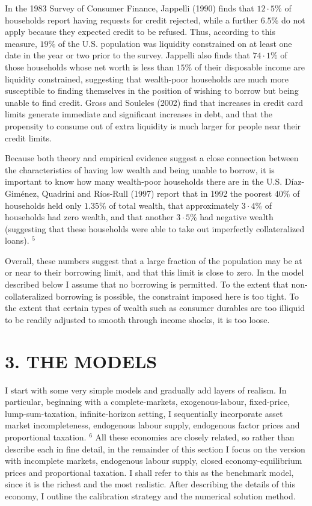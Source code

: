 \documentclass[11pt]{article}
\begin{document}
In the 1983 Survey of Consumer Finance, Jappelli (1990) finds that $12 \cdot 5 \%$ of households report having requests for credit rejected, while a further $6.5 \%$ do not apply because they expected credit to be refused. Thus, according to this measure, $19 \%$ of the U.S. population was liquidity constrained on at least one date in the year or two prior to the survey. Jappelli also finds that $74 \cdot 1 \%$ of those households whose net worth is less than $15 \%$ of their disposable income are liquidity constrained, suggesting that wealth-poor households are much more susceptible to finding themselves in the position of wishing to borrow but being unable to find credit. Gross and Souleles (2002) find that increases in credit card limits generate immediate and significant increases in debt, and that the propensity to consume out of extra liquidity is much larger for people near their credit limits.

Because both theory and empirical evidence suggest a close connection between the characteristics of having low wealth and being unable to borrow, it is important to know how many wealth-poor households there are in the U.S. Díaz-Giménez, Quadrini and Ríos-Rull (1997) report that in 1992 the poorest $40 \%$ of households held only $1.35 \%$ of total wealth, that approximately $3 \cdot 4 \%$ of households had zero wealth, and that another $3 \cdot 5 \%$ had negative wealth (suggesting that these households were able to take out imperfectly collateralized loans). ${ }^{5}$

Overall, these numbers suggest that a large fraction of the population may be at or near to their borrowing limit, and that this limit is close to zero. In the model described below I assume that no borrowing is permitted. To the extent that non-collateralized borrowing is possible, the constraint imposed here is too tight. To the extent that certain types of wealth such as consumer durables are too illiquid to be readily adjusted to smooth through income shocks, it is too loose.

\section*{3. THE MODELS}
I start with some very simple models and gradually add layers of realism. In particular, beginning with a complete-markets, exogenous-labour, fixed-price, lump-sum-taxation, infinite-horizon setting, I sequentially incorporate asset market incompleteness, endogenous labour supply, endogenous factor prices and proportional taxation. ${ }^{6}$ All these economies are closely related, so rather than describe each in fine detail, in the remainder of this section I focus on the version with incomplete markets, endogenous labour supply, closed economy-equilibrium prices and proportional taxation. I shall refer to this as the benchmark model, since it is the richest and the most realistic. After describing the details of this economy, I outline the calibration strategy and the numerical solution method.
\end{document}

